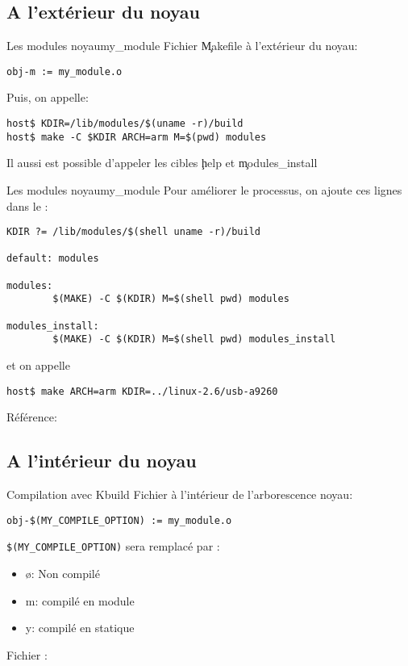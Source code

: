 \subsection{A l'extérieur du noyau}

\begin{frame}[fragile=singleslide]{Les modules noyau}{my\_module}
  Fichier \c{Makefile} à l'extérieur du noyau:
  \begin{lstlisting}
obj-m := my_module.o  
  \end{lstlisting}
  Puis, on appelle:
  \begin{lstlisting}
host$ KDIR=/lib/modules/$(uname -r)/build
host$ make -C $KDIR ARCH=arm M=$(pwd) modules
  \end{lstlisting} %
  Il aussi est possible d'appeler les cibles \c{help} et \c{modules_install}
\end{frame}

\begin{frame}[fragile=singleslide]{Les modules noyau}{my\_module}
  Pour améliorer le processus, on ajoute ces lignes dans le :
  \begin{lstlisting}
KDIR ?= /lib/modules/$(shell uname -r)/build

default: modules

modules:
        $(MAKE) -C $(KDIR) M=$(shell pwd) modules

modules_install:
        $(MAKE) -C $(KDIR) M=$(shell pwd) modules_install
  \end{lstlisting}
  et on appelle
  \begin{lstlisting}
host$ make ARCH=arm KDIR=../linux-2.6/usb-a9260 
  \end{lstlisting} %
  Référence: 
\end{frame}

\subsection{A l'intérieur du noyau}

\begin{frame}[fragile=singleslide]{Compilation avec Kbuild}
  Fichier  à l'intérieur de l'arborescence noyau:
  \begin{lstlisting}
obj-$(MY_COMPILE_OPTION) := my_module.o  
  \end{lstlisting} %
  \lstinline+$(MY_COMPILE_OPTION)+ sera remplacé par :
  \begin{itemize}
  \item ø: Non compilé
  \item m: compilé en module
  \item y: compilé en statique
  \end{itemize}
  Fichier :
  
\end{frame} 

